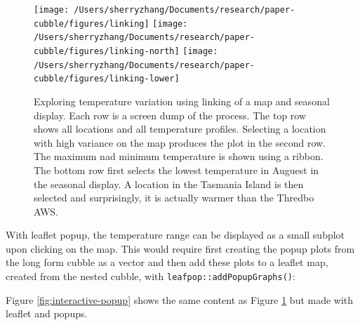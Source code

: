 \documentclass[
]{jss}
\begin{document}
\begin{CodeChunk}
\begin{figure}

{\centering \texttt{[image: /Users/sherryzhang/Documents/research/paper-cubble/figures/linking]} \texttt{[image: /Users/sherryzhang/Documents/research/paper-cubble/figures/linking-north]} \texttt{[image: /Users/sherryzhang/Documents/research/paper-cubble/figures/linking-lower]} 

}

\caption[Exploring temperature variation using linking of a map and seasonal display]{Exploring temperature variation using linking of a map and seasonal display. Each row is a screen dump of the process. The top row shows all locations and all temperature profiles. Selecting a location with high variance on the map produces the plot in the second row. The maximum nad minimum temperature is shown using a ribbon. The bottom row first selects the lowest temperature in Auguest in the seasonal display. A location in the Tasmania Island is then selected and surprisingly, it is actually warmer than the Thredbo AWS.}\label{fig:interactive-linking}
\end{figure}
\end{CodeChunk}

With leaflet popup, the temperature range can be displayed as a small
subplot upon clicking on the map. This would require first creating the
popup plots from the long form cubble as a vector and then add these
plots to a leaflet map, created from the nested cubble, with
\texttt{leafpop::addPopupGraphs()}:

\begin{CodeChunk}
\end{CodeChunk}

Figure \ref{fig:interactive-popup} shows the same content as Figure
\ref{fig:interactive-linking} but made with leaflet and popups.
\end{document}
